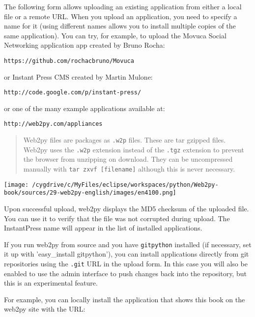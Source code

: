 \documentclass[justified,sixbynine,notoc]{tufte-book}
\def\ft{\small\tt}
\def\inxx#1{\index{#1}}
\begin{document}
\begin{fullwidth}
\inxx{Instant Press} \inxx{Movuca}
The following form allows uploading an existing application from either a local file or a remote URL. When you upload an application, you need to specify a name for it (using different names
allows you to install multiple copies of the same application). You can try, for example, to upload the Movuca Social Networking application app created by Bruno Rocha:

\begin{lstlisting}[keywords={}]
https://github.com/rochacbruno/Movuca
\end{lstlisting}
\noindent or Instant Press CMS created by Martin Mulone:

\begin{lstlisting}[keywords={}]
http://code.google.com/p/instant-press/
\end{lstlisting}
\noindent or one of the many example applications available at:

\begin{lstlisting}[keywords={}]
http://web2py.com/appliances
\end{lstlisting}

\begin{quote}Web2py files are packages as {\ft .w2p} files. These are tar gzipped files. Web2py uses the {\ft .w2p} extension instead of the {\ft .tgz} extension to prevent the browser from unzipping on download. They can be uncompressed manually with {\ft tar zxvf [filename]} although this is never necessary.\end{quote}

\goodbreak\begin{center}\texttt{[image: /cygdrive/c/MyFiles/eclipse/workspaces/python/Web2py-book/sources/29-web2py-english/images/en4100.png]}\end{center}


Upon successful upload, web2py displays the MD5 checksum of the uploaded file. You can use it to verify that the file was not corrupted during upload. The InstantPress name will appear in the list of installed applications.

If you run web2py from source and you have {\ft gitpython} installed (if necessary, set it up with 'easy\_install gitpython'), you can install applications directly from git repositories
using the {\ft .git} URL in the upload form. In this case you will also be enabled to use the admin interface to push changes back into the repository, but this is an experimental feature.

For example, you can locally install the application that shows this book on the web2py site with the URL:


\end{fullwidth}
\end{document}
